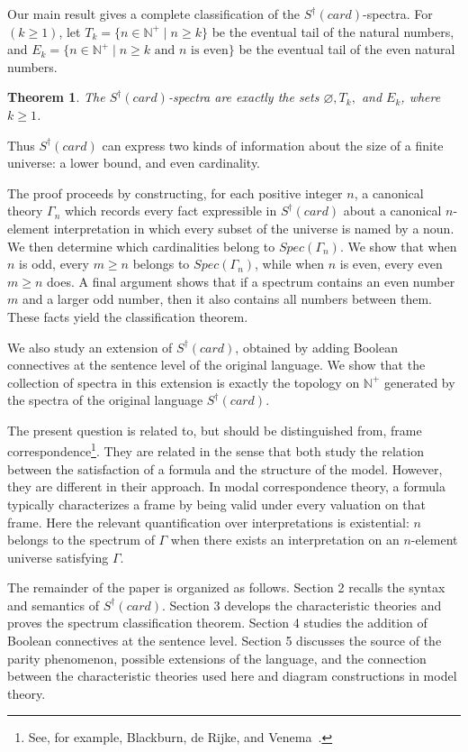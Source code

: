 \documentclass[12pt, reqno]{amsart}
\newtheorem{theorem}{Theorem}[section]
\theoremstyle{definition}
\theoremstyle{remark}
\numberwithin{equation}{section}
\begin{document}
Our main result gives a complete classification of the $S^{\dagger}(card)$-spectra. For $(k\geq1)$, let $T_k=\{n\in\mathbb{N}^+ \mid n\geq k\}$ be the eventual tail of the natural numbers, and $E_k=\{n\in\mathbb{N}^+ \mid n\geq k
\text{ and }n\text{ is even}\}$ be the eventual tail of the even natural numbers.

\begin{theorem}
	The $S^{\dagger}(card)$-spectra are exactly the sets $\varnothing, T_k,$ and $E_k$, where $k\geq1$.
\end{theorem}

Thus $S^{\dagger}(card)$ can express two kinds of information about the size of a finite universe: a lower bound, and even cardinality. 

The proof proceeds by constructing, for each positive integer $n$, a
canonical theory $\Gamma_n$ which records every fact expressible
in $S^\dagger(card)$ about a canonical $n$-element interpretation in
which every subset of the universe is named by a noun. We then determine
which cardinalities belong to $Spec(\Gamma_n)$. We show
that when $n$ is odd, every $m\geq n$ belongs to
$Spec(\Gamma_n)$, while when $n$ is even, every even
$m\geq n$ does. A final argument shows that if a spectrum contains an
even number $m$ and a larger odd number, then it also contains all
numbers between them. These facts yield the classification
theorem. 

We also study an extension of $S^{\dagger}(card)$, obtained by adding Boolean connectives at the sentence level of the original language. We show that the collection of spectra in this extension is exactly the topology on $\mathbb N^+$ generated by the spectra of the original language $S^{\dagger}(card)$.

The present question is related to, but should be distinguished from, frame correspondence\footnote{See, for example, Blackburn, de Rijke, and Venema~\cite{ML}.}. They are related in the sense that both study the relation between the satisfaction of a formula and the structure of the model. However, they are different in their approach. In modal correspondence theory, a formula typically characterizes a frame by being valid under every valuation on that frame. Here the relevant quantification over interpretations is existential: $n$ belongs to the spectrum of $\Gamma$ when there exists an interpretation on an $n$-element universe satisfying $\Gamma$. 

The remainder of the paper is organized as follows. Section 2 recalls the syntax and semantics of $S^\dagger(card)$. Section 3 develops the characteristic theories and proves the spectrum classification theorem. Section 4 studies the addition of Boolean connectives at the sentence level. Section 5 discusses the source of the parity phenomenon, possible extensions of the language, and the connection between the characteristic theories used here and diagram constructions in model theory.
\end{document}
